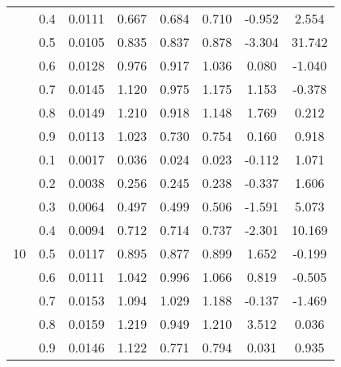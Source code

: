 \documentclass[11pt,a4paper]{report}
\begin{document}
\begin{longtable}{ | c | c || c | c | c | c | c | c | }
 & 0.4 & 0.0111 & 0.667 & 0.684 & 0.710 & -0.952 & 2.554 \\
 & 0.5 & 0.0105 & 0.835 & 0.837 & 0.878 & -3.304 & 31.742 \\
 & 0.6 & 0.0128 & 0.976 & 0.917 & 1.036 & 0.080 & -1.040 \\
 & 0.7 & 0.0145 & 1.120 & 0.975 & 1.175 & 1.153 & -0.378 \\
 & 0.8 & 0.0149 & 1.210 & 0.918 & 1.148 & 1.769 & 0.212 \\
 & 0.9 & 0.0113 & 1.023 & 0.730 & 0.754 & 0.160 & 0.918 \\
 \hline
\multirow{9}{*}{10} & 0.1 & 0.0017 & 0.036 & 0.024 & 0.023 & -0.112 & 1.071 \\
 & 0.2 & 0.0038 & 0.256 & 0.245 & 0.238 & -0.337 & 1.606 \\
 & 0.3 & 0.0064 & 0.497 & 0.499 & 0.506 & -1.591 & 5.073 \\
 & 0.4 & 0.0094 & 0.712 & 0.714 & 0.737 & -2.301 & 10.169 \\
 & 0.5 & 0.0117 & 0.895 & 0.877 & 0.899 & 1.652 & -0.199 \\
 & 0.6 & 0.0111 & 1.042 & 0.996 & 1.066 & 0.819 & -0.505 \\
 & 0.7 & 0.0153 & 1.094 & 1.029 & 1.188 & -0.137 & -1.469 \\
 & 0.8 & 0.0159 & 1.219 & 0.949 & 1.210 & 3.512 & 0.036 \\
 & 0.9 & 0.0146 & 1.122 & 0.771 & 0.794 & 0.031 & 0.935 \\
 \hline
\hline
\end{longtable}
\end{document}
